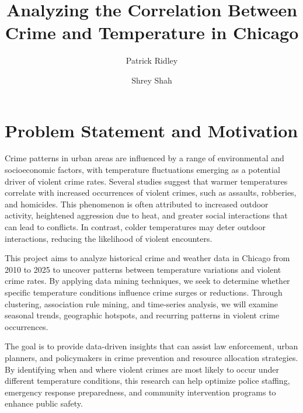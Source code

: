 \documentclass[sigconf,twocolumn,11pt]{acmart}
\title{Analyzing the Correlation Between Crime and Temperature in Chicago}
\author{Patrick Ridley}
\affiliation{
  \institution{University of Colorado Boulder}
  \country{USA}
}
\author{Shrey Shah}
\affiliation{
  \institution{University of Colorado Boulder}
  \country{USA}
}
\begin{document}
\maketitle

\section{Problem Statement and Motivation}
Crime patterns in urban areas are influenced by a range of environmental and socioeconomic factors, with temperature fluctuations emerging as a potential driver of violent crime rates. Several studies suggest that warmer temperatures correlate with increased occurrences of violent crimes, such as assaults, robberies, and homicides. This phenomenon is often attributed to increased outdoor activity, heightened aggression due to heat, and greater social interactions that can lead to conflicts. In contrast, colder temperatures may deter outdoor interactions, reducing the likelihood of violent encounters.

This project aims to analyze historical crime and weather data in Chicago from 2010 to 2025 to uncover patterns between temperature variations and violent crime rates. By applying data mining techniques, we seek to determine whether specific temperature conditions influence crime surges or reductions. Through clustering, association rule mining, and time-series analysis, we will examine seasonal trends, geographic hotspots, and recurring patterns in violent crime occurrences.

The goal is to provide data-driven insights that can assist law enforcement, urban planners, and policymakers in crime prevention and resource allocation strategies. By identifying when and where violent crimes are most likely to occur under different temperature conditions, this research can help optimize police staffing, emergency response preparedness, and community intervention programs to enhance public safety.
\end{document}
